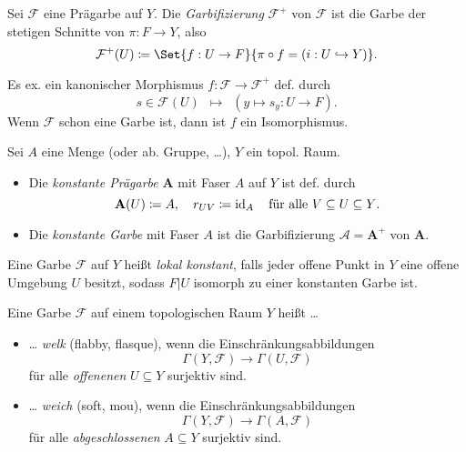 \documentclass{cheat-sheet}
\newcommand{\Fais}{\mathcal{F}} %
\begin{document}
\begin{defn}
  Sei $\Fais$ eine Prägarbe auf $Y$. Die \emph{Garbifizierung} $\Fais^+$ von $\Fais$ ist die Garbe der stetigen Schnitte von $\pi : F \to Y$, also
  \[ \Fais^+(U) \coloneqq \Set{f : U \to F}{\pi \circ f = (i : U \hookrightarrow Y)}. \]
\end{defn}

\begin{prop}
  Es ex. ein kanonischer Morphismus $f : \Fais \to \Fais^+$ def. durch
  \[ s \in \Fais(U) \enspace \mapsto \enspace (y \mapsto s_y : U \to F). \]
  Wenn $\Fais$ schon eine Garbe ist, dann ist $f$ ein Isomorphismus.
\end{prop}


\begin{defn}
  Sei $A$ eine Menge (oder ab. Gruppe, \ldots), $Y$ ein topol. Raum.
  \begin{itemize}
    \item Die \emph{konstante Prägarbe} $\mathbf{A}$ mit Faser $A$ auf $Y$ ist def. durch
    \[
      \mathbf{A}(U) \coloneqq A, \quad
      r_{UV} \coloneqq \operatorname{id}_A \quad
      \text{für alle $V \subseteq U \subseteq Y$.}
    \]
    \item Die \emph{konstante Garbe} mit Faser $A$ ist die Garbifizierung $\mathcal{A} = \mathbf{A}^+$ von $\mathbf{A}$.
  \end{itemize}
\end{defn}

\begin{defn}
  Eine Garbe $\Fais$ auf $Y$ heißt \emph{lokal konstant}, falls jeder offene Punkt in $Y$ eine offene Umgebung $U$ besitzt, sodass $F|U$ isomorph zu einer konstanten Garbe ist.
\end{defn}

\begin{defn}
   Eine Garbe $\Fais$ auf einem topologischen Raum $Y$ heißt \ldots{}
  \begin{itemize}
    \item \ldots{} \emph{welk} (flabby, flasque), wenn die Einschränkungsabbildungen
    \[ \Gamma(Y, \Fais) \to \Gamma(U, \Fais) \]
    für alle {\em offenenen} $U \subseteq Y$ surjektiv sind.
    \item \ldots{} \emph{weich} (soft, mou), wenn die Einschränkungsabbildungen
    \[ \Gamma(Y, \Fais) \to \Gamma(A, \Fais) \]
    für alle {\em abgeschlossenen} $A \subseteq Y$ surjektiv sind.
  \end{itemize}
\end{defn}
\end{document}

